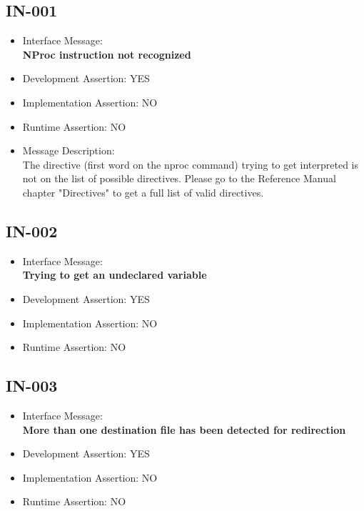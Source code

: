 %
%

\subsection{IN-001}
\begin{itemize}
  \item Interface Message:\\[1em]
    \textbf{NProc instruction not recognized}
  \item Development Assertion: YES
  \item Implementation Assertion: NO
  \item Runtime Assertion: NO
  \item Message Description:\\[1em]
    The directive (first word on the nproc command) trying to get interpreted is not on the list of possible directives. Please go to the Reference Manual chapter "Directives" to get a full list of valid directives.
\end{itemize}

\subsection{IN-002}
\begin{itemize}
  \item Interface Message:\\[1em]
    \textbf{Trying to get an undeclared variable}
  \item Development Assertion: YES
  \item Implementation Assertion: NO
  \item Runtime Assertion: NO
\end{itemize}

\subsection{IN-003}
\begin{itemize}
  \item Interface Message:\\[1em]
    \textbf{More than one destination file has been detected for redirection}
  \item Development Assertion: YES
  \item Implementation Assertion: NO
  \item Runtime Assertion: NO
\end{itemize}

